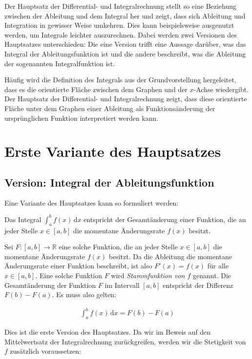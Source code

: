 \documentclass[fontsize=9pt,
               parskip=half-,
               DIV=14,
               listof=chapterentry,
               tocflat]{scrbook}
\begin{document}
Der Hauptsatz der Differential- und Integralrechnung stellt so eine Beziehung zwischen der Ableitung und dem Integral her und zeigt, dass sich Ableitung und Integration in gewisser Weise umkehren. Dies kann beispielsweise ausgenutzt werden, um Integrale leichter auszurechnen. Dabei werden zwei Versionen des Hauptsatzes unterschieden: Die eine Version trifft eine Aussage darüber, was das Integral der Ableitungsfunktion ist und die andere beschreibt, was die Ableitung der sogenannten Integralfunktion ist.

Häufig wird die Definition des Integrals aus der Grundvorstellung hergeleitet, dass es die orientierte Fläche zwischen dem Graphen und der $x$-Achse wiedergibt. Der Hauptsatz der Differential- und Integralrechnung zeigt, dass diese orientierte Fläche unter dem Graphen einer Ableitung als Funktionsänderung der ursprünglichen Funktion interpretiert werden kann.

\section{Erste Variante des Hauptsatzes}

\subsection{Version: Integral der Ableitungsfunktion}

Eine Variante des Hauptsatzes kann so formuliert werden:

\begin{importantparagraph*}
Das Integral $\int _{a}^{b}f(x)\,\mathrm {d} x$ entspricht der Gesamtänderung einer Funktion, die an jeder Stelle $x\in [a,b]$ die momentane Änderungsrate $f(x)$ besitzt.

\end{importantparagraph*}

Sei $F:[a,b]\to \mathbb {R} $ eine solche Funktion, die an jeder Stelle $x\in [a,b]$ die momentane Änderungsrate $f(x)$ besitzt. Da die Ableitung die momentane Änderungsrate einer Funktion beschreibt, ist also $F'(x)=f(x)$ für alle $x\in [a,b]$. Eine solche Funktion $F$ wird \emph{Stammfunktion von $f$} genannt. Die Gesamtänderung der Funktion $F$ im Intervall $[a,b]$ entspricht der Differenz $F(b)-F(a)$. Es muss also gelten:

\begin{align*}
\int _{a}^{b}f(x)\,\mathrm {d} x=F(b)-F(a)
\end{align*}

Dies ist die erste Version des Hauptsatzes. Da wir im Beweis auf den Mittelwertsatz der Integralrechnung zurückgreifen, werden wir die Stetigkeit von $f$ zusätzlich voraussetzen:
\end{document}

